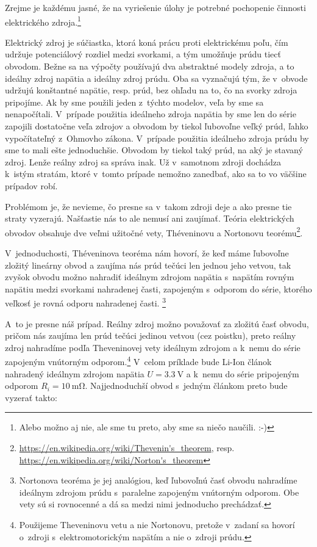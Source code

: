 Zrejme je každému jasné, že na vyriešenie úlohy je potrebné pochopenie
činnosti elektrického zdroja.\footnote{Alebo možno aj nie, ale sme tu preto, aby sme sa niečo naučili. :-)}

Elektrický zdroj je súčiastka, ktorá koná prácu proti elektrickému
poľu, čím udržuje potenciálový rozdiel medzi svorkami, a tým umožňuje
prúdu tiecť obvodom. Bežne sa na výpočty používajú dva abstraktné
modely zdroja, a to ideálny zdroj napätia a ideálny zdroj prúdu. Oba
sa vyznačujú tým, že v~obvode udržujú konštantné napätie, resp. prúd,
bez ohľadu na to, čo na svorky zdroja pripojíme. Ak by sme použili
jeden z~týchto modelov, veľa by sme sa nenapočítali. V~prípade použitia
ideálneho zdroja napätia by sme len do série zapojili dostatočne veľa
zdrojov a obvodom by tiekol ľubovoľne veľký prúd, ľahko vypočítateľný
z~Ohmovho zákona. V~prípade použitia ideálneho zdroja prúdu by sme
to mali ešte jednoduchšie. Obvodom by tiekol taký prúd, na aký je
stavaný zdroj. Lenže reálny zdroj sa správa inak. Už v~samotnom zdroji
dochádza k~istým stratám, ktoré v~tomto prípade nemožno zanedbať,
ako sa to vo väčšine prípadov robí.

Problémom je, že nevieme, čo presne sa v~takom zdroji deje a ako presne
tie straty vyzerajú. Našťastie nás to ale nemusí ani zaujímať. Teória
elektrických obvodov obsahuje dve veľmi užitočné vety, Théveninovu
a Nortonovu teorému\footnote{\url{https://en.wikipedia.org/wiki/Thevenin's\_theorem}, resp.
\url{https://en.wikipedia.org/wiki/Norton's\_theorem}}. 

V~jednoduchosti, Théveninova teoréma nám hovorí, že keď máme ľubovoľne
zložitý lineárny obvod a zaujíma nás prúd tečúci len jednou jeho vetvou,
tak zvyšok obvodu možno nahradiť ideálnym zdrojom napätia s~napätím rovným 
napätiu medzi svorkami nahradenej časti, zapojeným s~odporom do série,
ktorého veľkosť je rovná odporu nahradenej časti.%
\footnote{Nortonova teoréma je jej analógiou, keď ľubovoľnú časť obvodu nahradíme 
ideálnym zdrojom prúdu s~paralelne zapojeným vnútorným odporom. Obe
vety sú si rovnocenné a dá sa medzi nimi jednoducho prechádzať.} 

A~to je presne náš prípad. Reálny zdroj možno považovať za zložitú
časť obvodu, pričom nás zaujíma len prúd tečúci jedinou vetvou (cez
poistku), preto reálny zdroj nahradíme podľa Theveninovej vety ideálnym
zdrojom a k~nemu do série zapojeným vnútorným odporom.\footnote{Použijeme Theveninovu vetu a nie Nortonovu, pretože v~zadaní sa hovorí o~zdroji s~elektromotorickým napätím a nie o~zdroji prúdu.} V~celom príklade bude Li-Ion článok nahradený ideálnym zdrojom napätia
$U=\SI{3.3}{\volt}$ a k~nemu do série pripojeným odporom $R_{i}=\SI{10}{\milli\ohm}$.
Najjednoduchší obvod s~jedným článkom preto bude vyzerať takto:

